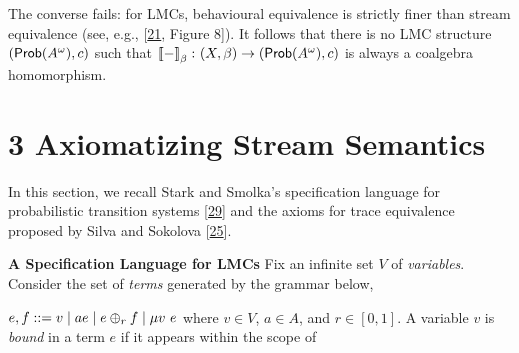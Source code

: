 \par\medskip
\hypertarget{html:S2.SS0.SSS0.P0.SPx3.p5}{} The converse fails: for LMCs, behavioural equivalence is strictly finer than stream equivalence (see, e.g., [\hyperlink{html:bib.bib21}{21}, Figure 8]). It follows that there is no LMC structure %
\hypertarget{html:S2.SS0.SSS0.P0.SPx3.p5.m1}{}\({(\text{\sf Prob}(A^{\omega}),c)}\) such that %
\hypertarget{html:S2.SS0.SSS0.P0.SPx3.p5.m2}{}\({\left\llbracket{-}\right\rrbracket_{\beta}\colon(X,\beta)\to(\text{\sf Prob}(A^{\omega}),c)}\) is always a coalgebra homomorphism.
\par\medskip
   
%
\hypertarget{html:S3}{} \section*{3 Axiomatizing Stream Semantics}
\hypertarget{html:S3.p1}{} In this section, we recall Stark and Smolka’s specification language for probabilistic transition systems [\hyperlink{html:bib.bib29}{29}] and the axioms for trace equivalence proposed by Silva and Sokolova [\hyperlink{html:bib.bib25}{25}].
\par\medskip
\hypertarget{html:S3.SS0.SSS0.Px1}{} \par\noindent\textbf{A Specification Language for LMCs}\quad  %
\hypertarget{html:S3.SS0.SSS0.Px1.p1}{} Fix an infinite set %
\hypertarget{html:S3.SS0.SSS0.Px1.p1.m1}{}\({V}\) of \emph{variables}. Consider the set of \emph{terms} generated by the grammar below,
\par\medskip
\hypertarget{html:S8.EGx1}{} %
\hypertarget{html:S3.Ex1}{}  %
\hypertarget{html:S3.Ex1.m1}{}\({\displaystyle e,f::=v\mid ae\mid e\oplus_{r}f\mid\mu v\leavevmode\nobreak\ e}\)    where %
\hypertarget{html:S3.SS0.SSS0.Px1.p1.m2}{}\({v\in V}\), %
\hypertarget{html:S3.SS0.SSS0.Px1.p1.m3}{}\({a\in A}\), and %
\hypertarget{html:S3.SS0.SSS0.Px1.p1.m4}{}\({r\in[0,1]}\). A variable %
\hypertarget{html:S3.SS0.SSS0.Px1.p1.m5}{}\({v}\) is \emph{bound} in a term %
\hypertarget{html:S3.SS0.SSS0.Px1.p1.m6}{}\({e}\) if it appears within the scope of %
